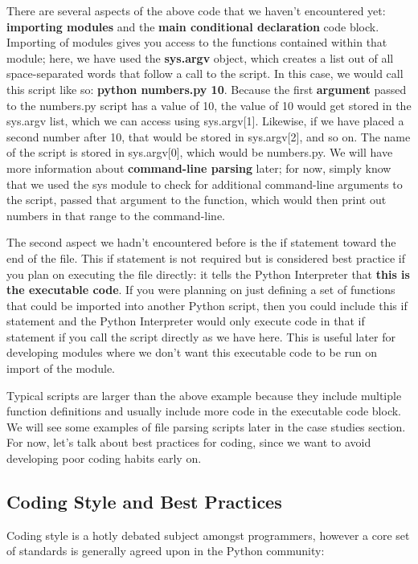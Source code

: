 \documentclass[a4paper,11pt]{article}
\begin{document}
There are several aspects of the above code that we haven't encountered yet: \textbf{importing modules} and 
the \textbf{main conditional declaration} code block.  Importing of modules gives you access to the 
functions contained within that module; here, we have used the \textbf{sys.argv} object, which creates a list 
out of all space-separated words that follow a call to the script.  In this case, we would call this script 
like so: \textbf{python numbers.py 10}.  Because the first \textbf{argument} passed to the numbers.py script 
has a value of 10, the value of 10 would get stored in the sys.argv list, which we can access using sys.argv[1].  
Likewise, if we have placed a second number after 10, that would be stored in sys.argv[2], and so on.  The name 
of the script is stored in sys.argv[0], which would be numbers.py.  We will have more information about 
\textbf{command-line parsing} later; for now, simply know that we used the sys module to check for additional 
command-line arguments to the script, passed that argument to the function, which would then print out numbers 
in that range to the command-line.  \par

The second aspect we hadn't encountered before is the if statement toward the end of the file.  This if statement 
is not required but is considered best practice if you plan on executing the file directly: it tells the 
Python Interpreter that \textbf{this is the executable code}.  If you were planning on just defining a 
set of functions that could be imported into another Python script, then you could include this if 
statement and the Python Interpreter would only execute code in that if statement if you call the script 
directly as we have here.  This is useful later for developing modules where we don't want this executable 
code to be run on import of the module.  \par

Typical scripts are larger than the above example because they include multiple function definitions and 
usually include more code in the executable code block.  We will see some examples of file parsing scripts 
later in the case studies section.  For now, let's talk about best practices for coding, since we want to 
avoid developing poor coding habits early on.

\pagebreak
\subsection{Coding Style and Best Practices}
Coding style is a hotly debated subject amongst programmers, however a core set of standards is generally 
agreed upon in the Python community:
\end{document}
